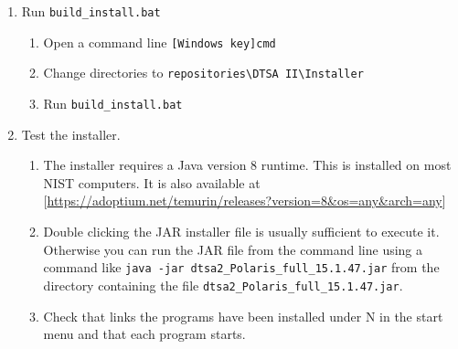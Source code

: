 \documentclass{article}
\begin{document}
\begin{enumerate}
\begin{verbatim}
        \end{verbatim}
    \begin{enumerate}
        \item At a minimum, increment the final number in \verb|NUM_VER| and set today's date in \verb|D2V|.
    \end{enumerate}
    \item Run \verb|build_install.bat|
    \begin{enumerate}
        \item Open a command line \verb|[Windows key]cmd|
        \item Change directories to \verb|repositories\DTSA II\Installer|
        \item Run \verb|build_install.bat|
    \end{enumerate}
    \item Test the installer.
    \begin{enumerate}
        \item The installer requires a Java version 8 runtime.  This is installed on most NIST computers. It is also available at [\url{https://adoptium.net/temurin/releases?version=8&os=any&arch=any}]
        \item Double clicking the JAR installer file is usually sufficient to execute it. Otherwise you can run the JAR file from the command line using a command like \verb|java -jar dtsa2_Polaris_full_15.1.47.jar| from the directory containing the file \verb|dtsa2_Polaris_full_15.1.47.jar|.
        \item Check that links the programs have been installed under N in the start menu and that each program starts.
    \end{enumerate}
\end{enumerate}
\end{document}
